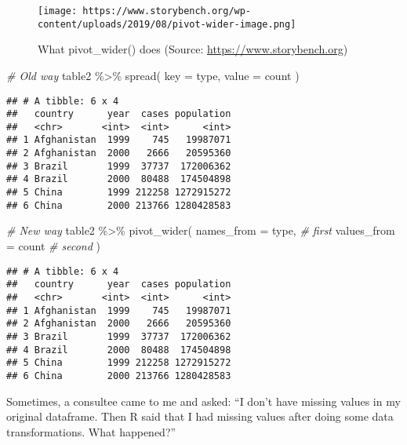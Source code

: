 \documentclass[
]{book}
\newenvironment{Shaded}{\begin{snugshade}}{\end{snugshade}}
\newcommand{\AttributeTok}[1]{\textcolor[rgb]{0.77,0.63,0.00}{#1}}
\newcommand{\CommentTok}[1]{\textcolor[rgb]{0.56,0.35,0.01}{\textit{#1}}}
\newcommand{\FunctionTok}[1]{\textcolor[rgb]{0.00,0.00,0.00}{#1}}
\newcommand{\NormalTok}[1]{#1}
\newcommand{\SpecialCharTok}[1]{\textcolor[rgb]{0.00,0.00,0.00}{#1}}
\begin{document}
\begin{figure}
\centering
\texttt{[image: https://www.storybench.org/wp-content/uploads/2019/08/pivot-wider-image.png]}
\caption{What pivot\_wider() does (Source: \url{https://www.storybench.org})}
\end{figure}

\begin{Shaded}
\begin{Highlighting}[]
\CommentTok{\# Old way}
\NormalTok{table2 }\SpecialCharTok{\%\textgreater{}\%}
  \FunctionTok{spread}\NormalTok{(}
    \AttributeTok{key =}\NormalTok{ type,}
    \AttributeTok{value =}\NormalTok{ count}
\NormalTok{  )}
\end{Highlighting}
\end{Shaded}

\begin{verbatim}
## # A tibble: 6 x 4
##   country      year  cases population
##   <chr>       <int>  <int>      <int>
## 1 Afghanistan  1999    745   19987071
## 2 Afghanistan  2000   2666   20595360
## 3 Brazil       1999  37737  172006362
## 4 Brazil       2000  80488  174504898
## 5 China        1999 212258 1272915272
## 6 China        2000 213766 1280428583
\end{verbatim}

\begin{Shaded}
\begin{Highlighting}[]
\CommentTok{\# New way}
\NormalTok{table2 }\SpecialCharTok{\%\textgreater{}\%}
  \FunctionTok{pivot\_wider}\NormalTok{(}
    \AttributeTok{names\_from =}\NormalTok{ type, }\CommentTok{\# first}
    \AttributeTok{values\_from =}\NormalTok{ count }\CommentTok{\# second}
\NormalTok{  )}
\end{Highlighting}
\end{Shaded}

\begin{verbatim}
## # A tibble: 6 x 4
##   country      year  cases population
##   <chr>       <int>  <int>      <int>
## 1 Afghanistan  1999    745   19987071
## 2 Afghanistan  2000   2666   20595360
## 3 Brazil       1999  37737  172006362
## 4 Brazil       2000  80488  174504898
## 5 China        1999 212258 1272915272
## 6 China        2000 213766 1280428583
\end{verbatim}

Sometimes, a consultee came to me and asked: ``I don't have missing values in my original dataframe. Then R said that I had missing values after doing some data transformations. What happened?''
\end{document}
